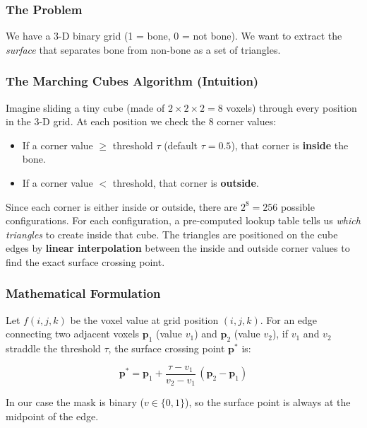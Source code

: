 \documentclass[12pt,a4paper]{article}
\begin{document}
\subsubsection{The Problem}

We have a 3-D binary grid (1 = bone, 0 = not bone).  We want to extract the
\emph{surface} that separates bone from non-bone as a set of triangles.

\subsubsection{The Marching Cubes Algorithm (Intuition)}

Imagine sliding a tiny cube (made of $2 \times 2 \times 2 = 8$ voxels) through
every position in the 3-D grid.  At each position we check the 8 corner values:

\begin{itemize}
    \item If a corner value $\geq$ threshold $\tau$ (default $\tau = 0.5$),
          that corner is \textbf{inside} the bone.
    \item If a corner value $<$ threshold, that corner is \textbf{outside}.
\end{itemize}

Since each corner is either inside or outside, there are $2^8 = 256$ possible
configurations.  For each configuration, a pre-computed lookup table tells us
\emph{which triangles} to create inside that cube.  The triangles are positioned
on the cube edges by \textbf{linear interpolation} between the inside and
outside corner values to find the exact surface crossing point.

\subsubsection{Mathematical Formulation}

Let $f(i,j,k)$ be the voxel value at grid position $(i,j,k)$.  For an edge
connecting two adjacent voxels $\mathbf{p}_1$ (value $v_1$) and $\mathbf{p}_2$
(value $v_2$), if $v_1$ and $v_2$ straddle the threshold $\tau$, the surface
crossing point $\mathbf{p}^*$ is:

\begin{equation}
    \boxed{
        \mathbf{p}^* = \mathbf{p}_1 + \frac{\tau - v_1}{v_2 - v_1}
        \,(\mathbf{p}_2 - \mathbf{p}_1)
    }
    \label{eq:interp}
\end{equation}

In our case the mask is binary ($v \in \{0, 1\}$), so the surface point is
always at the midpoint of the edge.
\end{document}
